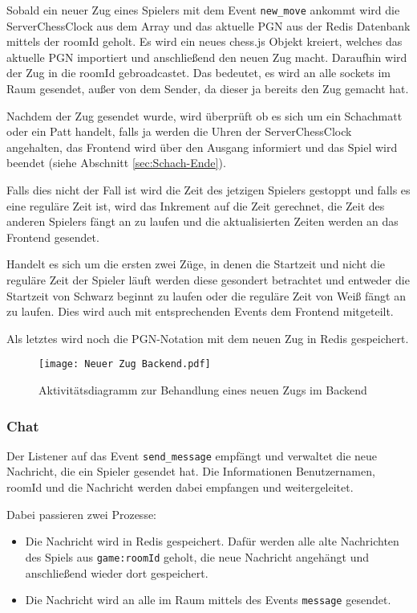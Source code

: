 Sobald ein neuer Zug eines Spielers mit dem Event \verb|new_move| ankommt wird die ServerChessClock aus dem Array und das aktuelle PGN aus der Redis Datenbank mittels der roomId geholt. Es wird ein neues chess.js Objekt kreiert, welches das aktuelle PGN importiert und anschließend den neuen Zug macht. Daraufhin wird der Zug in die roomId gebroadcastet. Das bedeutet, es wird an alle sockets im Raum gesendet, außer von dem Sender, da dieser ja bereits den Zug gemacht hat.

Nachdem der Zug gesendet wurde, wird überprüft ob es sich um ein Schachmatt oder ein Patt handelt, falls ja werden die Uhren der ServerChessClock angehalten, das Frontend wird über den Ausgang informiert und das Spiel wird beendet (siehe Abschnitt \ref{sec:Schach-Ende}). 

Falls dies nicht der Fall ist wird die Zeit des jetzigen Spielers gestoppt und falls es eine reguläre Zeit ist, wird das Inkrement auf die Zeit gerechnet, die Zeit des anderen Spielers fängt an zu laufen und die aktualisierten Zeiten werden an das Frontend gesendet.

Handelt es sich um die ersten zwei Züge, in denen die Startzeit und nicht die reguläre Zeit der Spieler läuft werden diese gesondert betrachtet und entweder die Startzeit von Schwarz beginnt zu laufen oder die reguläre Zeit von Weiß fängt an zu laufen. Dies wird auch mit entsprechenden Events dem Frontend mitgeteilt.

Als letztes wird noch die PGN-Notation mit dem neuen Zug in Redis gespeichert.


\begin{figure}[h!]
\centering
\texttt{[image: Neuer Zug Backend.pdf]}
\caption{Aktivitätsdiagramm zur Behandlung eines neuen Zugs im Backend}
\label{fig:Zug-Backend}
\end{figure}

\subsubsection{Chat}
Der Listener auf das Event \verb|send_message| empfängt und verwaltet die neue Nachricht, die ein Spieler gesendet hat. Die Informationen Benutzernamen, roomId und die Nachricht werden dabei empfangen und weitergeleitet.

Dabei passieren zwei Prozesse:
\begin{itemize}
\item Die Nachricht wird in Redis gespeichert. Dafür werden alle alte Nachrichten des Spiels aus \verb|game:roomId| geholt, die neue Nachricht angehängt und anschließend wieder dort gespeichert.
\item Die Nachricht wird an alle im Raum mittels des Events \verb|message| gesendet.
\end{itemize}

